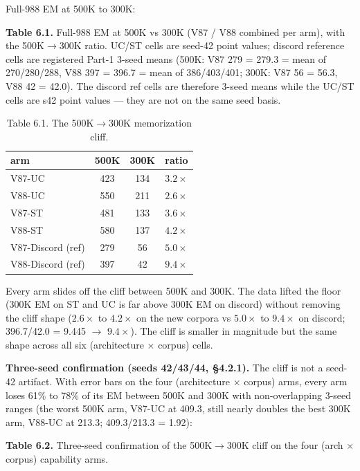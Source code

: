 \documentclass[11pt]{article}
\begin{document}
Full-988 EM at 500K to 300K:

\textbf{Table 6.1.} Full-988 EM at 500K vs 300K (V87 / V88 combined per arm), with the 500K$\to$300K ratio. UC/ST cells are seed-42 point values; discord reference cells are registered Part-1 3-seed means (500K: V87 279 = 279.3 = mean of 270/280/288, V88 397 = 396.7 = mean of 386/403/401; 300K: V87 56 = 56.3, V88 42 = 42.0). The discord ref cells are therefore 3-seed means while the UC/ST cells are s42 point values --- they are not on the same seed basis.

\begin{table}[!t]
\centering
\small
\caption*{Table 6.1. The 500K$\to$300K memorization cliff.}
\begin{tabular}{lccc}
\toprule
arm & 500K & 300K & ratio \\
\midrule
V87-UC & 423 & 134 & $3.2\times$ \\
V88-UC & 550 & 211 & $2.6\times$ \\
V87-ST & 481 & 133 & $3.6\times$ \\
V88-ST & 580 & 137 & $4.2\times$ \\
V87-Discord (ref) & 279 & 56 & $5.0\times$ \\
V88-Discord (ref) & 397 & 42 & $9.4\times$ \\
\bottomrule
\end{tabular}
\end{table}

Every arm slides off the cliff between 500K and 300K. The data lifted the floor (300K EM on ST and UC is far above 300K EM on discord) without removing the cliff shape ($2.6\times$ to $4.2\times$ on the new corpora vs $5.0\times$ to $9.4\times$ on discord; 396.7/42.0 = 9.445 $\to$ $9.4\times$). The cliff is smaller in magnitude but the same shape across all six (architecture $\times$ corpus) cells.

\textbf{Three-seed confirmation (seeds 42/43/44, \S4.2.1).} The cliff is not a seed-42 artifact. With error bars on the four (architecture $\times$ corpus) arms, every arm loses 61\% to 78\% of its EM between 500K and 300K with non-overlapping 3-seed ranges (the worst 500K arm, V87-UC at 409.3, still nearly doubles the best 300K arm, V88-UC at 213.3; 409.3/213.3 = 1.92):

\textbf{Table 6.2.} Three-seed confirmation of the 500K$\to$300K cliff on the four (arch $\times$ corpus) capability arms.
\end{document}
